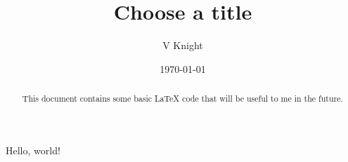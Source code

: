 \documentclass{article} %
\title{Choose a title}
\author{V Knight}
\date{\today}
\begin{document}

\begin{abstract}
    This document contains some basic LaTeX code that will be useful to me
    in the future.
\end{abstract}

\maketitle

Hello, world!
\end{document}
